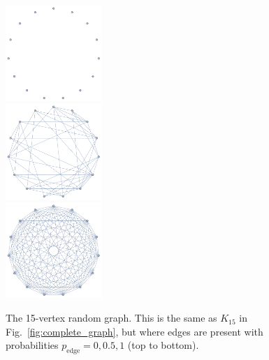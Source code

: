 \pubmode
	\begin{figure}[!htbp]
	\includegraphics[width=0.325\textwidth]{random_0}\\
	\includegraphics[width=0.325\textwidth]{random_05}\\
	\includegraphics[width=0.325\textwidth]{random_1}
	\caption{The 15-vertex random graph. This is the same as $K_{15}$ in Fig.~\ref{fig:complete_graph}, but where edges are present with probabilities \mbox{$p_\mathrm{edge}=0,0.5,1$} (top to bottom).} \label{fig:random_graph}
	\end{figure}
\else
